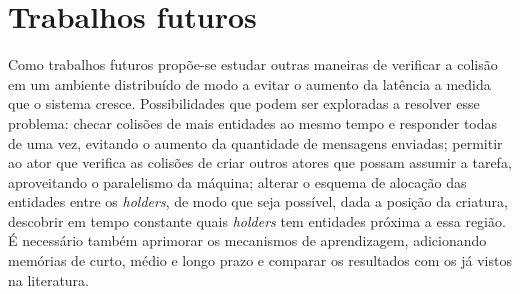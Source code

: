 \section{Trabalhos futuros}

Como trabalhos futuros propõe-se estudar outras maneiras de verificar a colisão em um ambiente distribuído de modo a evitar o aumento  da latência a medida que o sistema cresce. Possibilidades que podem ser exploradas a resolver esse problema: checar colisões de mais entidades ao mesmo tempo e responder todas de uma vez, evitando o aumento da quantidade de mensagens enviadas; permitir ao ator que verifica as colisões de criar outros atores que possam assumir a tarefa, aproveitando o paralelismo da máquina; alterar o esquema de alocação das entidades entre os \textit{holders}, de modo que seja possível, dada a posição da criatura, descobrir em tempo constante quais \textit{holders} tem entidades próxima a essa região. É necessário também aprimorar os mecanismos de aprendizagem, adicionando memórias de curto, médio e longo prazo e comparar os resultados com os já vistos na literatura. 






